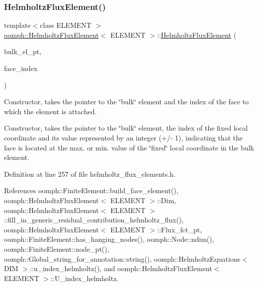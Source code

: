 \subsubsection{\texorpdfstring{Helmholtz\+Flux\+Element()}{HelmholtzFluxElement()}\hspace{0.1cm}{\footnotesize\ttfamily [1/3]}}
{\footnotesize\ttfamily template$<$class E\+L\+E\+M\+E\+NT $>$ \\
\hyperlink{classoomph_1_1HelmholtzFluxElement}{oomph\+::\+Helmholtz\+Flux\+Element}$<$ E\+L\+E\+M\+E\+NT $>$\+::\hyperlink{classoomph_1_1HelmholtzFluxElement}{Helmholtz\+Flux\+Element} (\begin{DoxyParamCaption}\item[{\hyperlink{classoomph_1_1FiniteElement}{Finite\+Element} $\ast$const \&}]{bulk\+\_\+el\+\_\+pt,  }\item[{const int \&}]{face\+\_\+index }\end{DoxyParamCaption})}



Constructor, takes the pointer to the \char`\"{}bulk\char`\"{} element and the index of the face to which the element is attached. 

Constructor, takes the pointer to the \char`\"{}bulk\char`\"{} element, the index of the fixed local coordinate and its value represented by an integer (+/-\/ 1), indicating that the face is located at the max. or min. value of the \char`\"{}fixed\char`\"{} local coordinate in the bulk element. 

Definition at line 257 of file helmholtz\+\_\+flux\+\_\+elements.\+h.



References oomph\+::\+Finite\+Element\+::build\+\_\+face\+\_\+element(), oomph\+::\+Helmholtz\+Flux\+Element$<$ E\+L\+E\+M\+E\+N\+T $>$\+::\+Dim, oomph\+::\+Helmholtz\+Flux\+Element$<$ E\+L\+E\+M\+E\+N\+T $>$\+::fill\+\_\+in\+\_\+generic\+\_\+residual\+\_\+contribution\+\_\+helmholtz\+\_\+flux(), oomph\+::\+Helmholtz\+Flux\+Element$<$ E\+L\+E\+M\+E\+N\+T $>$\+::\+Flux\+\_\+fct\+\_\+pt, oomph\+::\+Finite\+Element\+::has\+\_\+hanging\+\_\+nodes(), oomph\+::\+Node\+::ndim(), oomph\+::\+Finite\+Element\+::node\+\_\+pt(), oomph\+::\+Global\+\_\+string\+\_\+for\+\_\+annotation\+::string(), oomph\+::\+Helmholtz\+Equations$<$ D\+I\+M $>$\+::u\+\_\+index\+\_\+helmholtz(), and oomph\+::\+Helmholtz\+Flux\+Element$<$ E\+L\+E\+M\+E\+N\+T $>$\+::\+U\+\_\+index\+\_\+helmholtz.

\mbox{\label{classoomph_1_1HelmholtzFluxElement_a73182cbef5c3c2ccb7abdb6337b3651b}} 
